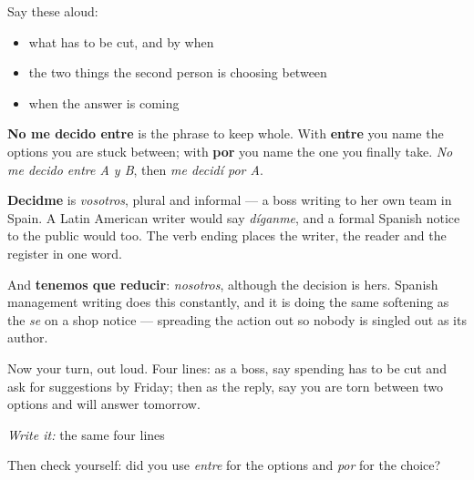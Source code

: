 Say these aloud:

\begin{itemize}
\raggedright
  \item what has to be cut, and by when
  \item the two things the second person is choosing between
  \item when the answer is coming
\end{itemize}

\begin{culture}
\textbf{No me decido entre} is the phrase to keep whole. With \textbf{entre} you name the options you are stuck between; with \textbf{por} you name the one you finally take. \emph{No me decido entre A y B}, then \emph{me decidí por A}.

\textbf{Decidme} is \emph{vosotros}, plural and informal — a boss writing to her own team in Spain. A Latin American writer would say \emph{díganme}, and a formal Spanish notice to the public would too. The verb ending places the writer, the reader and the register in one word.

And \textbf{tenemos que reducir}: \emph{nosotros}, although the decision is hers. Spanish management writing does this constantly, and it is doing the same softening as the \emph{se} on a shop notice — spreading the action out so nobody is singled out as its author.
\end{culture}

\begin{tcolorbox}[breakable,colback=teal!4,colframe=teal!35!black,title={Before you move on}]
Now your turn, out loud. Four lines: as a boss, say spending has to be cut and ask for suggestions by Friday; then as the reply, say you are torn between two options and will answer tomorrow.

\emph{Write it:} the same four lines

Then check yourself: did you use \emph{entre} for the options and \emph{por} for the choice?
\end{tcolorbox}
